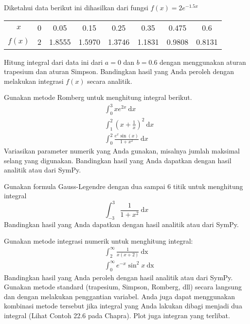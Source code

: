 \begin{soal}[Chapra 21.13]
Diketahui data berikut ini dihasilkan dari fungsi $f(x)=2e^{-1.5x}$

{\centering
\begin{tabular}{|c|ccccccc|}
\hline
$x$    & 0 & 0.05   & 0.15 & 0.25 & 0.35 & 0.475 & 0.6 \\
$f(x)$ & 2 & 1.8555 & 1.5970 & 1.3746 & 1.1831 & 0.9808 & 0.8131 \\
\hline
\end{tabular}
\par}

Hitung integral dari data ini dari $a=0$ dan $b=0.6$ dengan menggunakan
aturan trapesium dan aturan Simpson. Bandingkan hasil yang Anda peroleh
dengan melakukan integrasi $f(x)$ secara analitik.
\end{soal}

\begin{soal}
Gunakan metode Romberg untuk menghitung integral berikut.
\begin{align}
& \int_{0}^{3} x e^{2x}\ \mathrm{d}x \\
& \int_{1}^{2} \left( x + \frac{1}{x} \right)^2 \ \mathrm{d}x \\
& \int_{0}^{2} \frac{e^{x}\sin(x)}{1 + x^2}\ \mathrm{d}x
\end{align}
Variasikan parameter numerik yang Anda gunakan, misalnya jumlah maksimal selang
yang digunakan.
Bandingkan hasil yang Anda dapatkan dengan hasil analitik atau dari SymPy.
\end{soal}


\begin{soal}
Gunakan formula Gauss-Legendre dengan dua sampai 6 titik untuk menghitung integral
\begin{equation}
\int_{-3}^{3} \frac{1}{1 + x^2}\ \mathrm{d}x
\end{equation}
Bandingkan hasil yang Anda dapatkan dengan hasil analitik atau dari SymPy.
\end{soal}

\begin{soal}
Gunakan metode integrasi numerik untuk menghitung integral:
\begin{align}
& \int_{2}^{\infty} \frac{1}{x(x + 2)}\ \mathrm{dx} \\
& \int_{0}^{\infty} e^{-x} \sin^{2} x\ \mathrm{dx}
\end{align}
Bandingkan hasil yang Anda peroleh dengan hasil analitik atau dari SymPy.
Gunakan metode standard (trapesium, Simpson, Romberg, dll) secara
langsung dan dengan melakukan penggantian variabel. Anda juga dapat menggunakan
kombinasi metode tersebut jika integral yang Anda lakukan dibagi menjadi dua
integral (Lihat Contoh 22.6 pada Chapra). Plot juga integran yang terlibat.
\end{soal}


